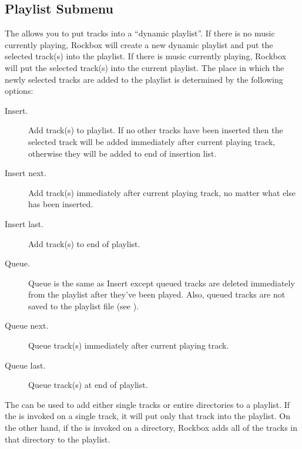 \subsection{\label{ref:Playlistsubmenu}Playlist Submenu}
The  allows you to put tracks into a ``dynamic
playlist''. If there is no music currently playing, Rockbox will create a
new dynamic playlist and put the selected track(s) into the playlist.
If there is music currently playing, Rockbox will put the selected track(s)
into the current playlist.  The place in which
the newly selected tracks are added to the playlist is determined by
the following options:

\begin{description}
\item [Insert.]
  Add track(s) to playlist. If no other tracks have been inserted then the
  selected track will be added immediately after current playing track,
  otherwise they will be added to end of insertion list.
\item [Insert next.]
  Add track(s) immediately after current playing track, no matter what else has
  been inserted.
\item [Insert last.]
  Add track(s) to end of playlist.
\item [Queue.]
  Queue is the same as Insert except queued tracks are deleted immediately from
  the playlist after they've been played. Also, queued tracks are not saved to
  the playlist file (see ).
\item [Queue next.]
  Queue track(s) immediately after current playing track.
\item [Queue last.]
  Queue track(s) at end of playlist.
\end{description}

The  can be used to add either single tracks or
entire directories to a playlist. If the  is
invoked on a single track, it will put only that track into the playlist.
On the other hand, if the  is invoked on a
directory, Rockbox adds all of the tracks in that directory to the playlist.



